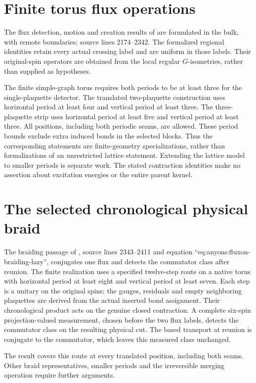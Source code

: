 \documentclass{article}
\begin{document}
\section{Finite torus flux operations}
The flux detection, motion and creation results of
\cite[Theorems~6.15--6.17]{Schuch2010PEPS} are formulated in the bulk,
with remote boundaries; source lines 2174--2342. The formalized
regional identities retain every actual crossing label and are uniform
in those labels. Their original-spin operators are obtained from the
local regular $G$-isometries, rather than supplied as hypotheses.

The finite simple-graph torus requires both periods to be at least
three for the single-plaquette detector. The translated two-plaquette
construction uses horizontal period at least four and vertical period
at least three. The three-plaquette strip uses horizontal period at
least five and vertical period at least three. All positions, including
both periodic seams, are allowed. These period bounds exclude extra
induced bonds in the selected blocks. Thus the corresponding statements
are finite-geometry specializations, rather than formalizations of an
unrestricted lattice statement. Extending the lattice model to smaller
periods is separate work. The stated contraction identities make no
assertion about excitation energies or the entire parent kernel.

\section{The selected chronological physical braid}
The braiding passage of \cite[\S6.6]{Schuch2010PEPS}, source lines
2343--2411 and equation ``eq:anyons:fluxon-braiding-lazy'', conjugates
one flux and detects the commutator class after reunion. The finite
realization uses a specified twelve-step route on a native torus with
horizontal period at least eight and vertical period at least seven.
Each step is a unitary on the original spins; the gauges, residuals
and empty neighboring plaquettes are derived from the actual inserted
bond assignment. Their chronological product acts on the genuine
closed contraction. A complete six-spin projection-valued measurement,
chosen before the two flux labels, detects the commutator class on
the resulting physical cut. The based transport at reunion is conjugate
to the commutator, which leaves this measured class unchanged.

The result covers this route at every translated position, including
both seams. Other braid representatives, smaller periods and the
irreversible merging operation require further arguments.
\end{document}

